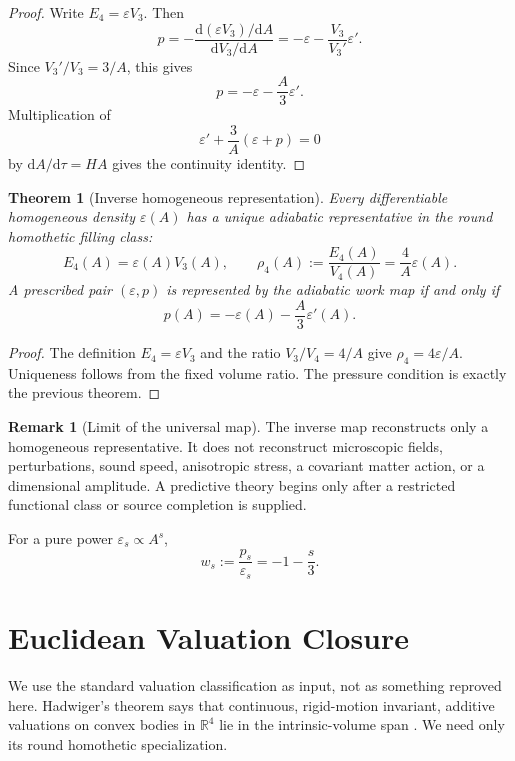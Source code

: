 \documentclass[aps,prd,preprint,onecolumn,nofootinbib,superscriptaddress,showkeys]{revtex4-2}
\numberwithin{equation}{section}
\theoremstyle{definition}
\newtheorem{remark}{Remark}[section]
\theoremstyle{plain}
\newtheorem{theorem}{Theorem}[section]
\newcommand{\R}{\mathbb R}
\newcommand{\dd}{\mathrm d}
\begin{document}
\begin{proof}
Write \(E_4=\varepsilon V_3\).  Then
\[
p=-\frac{\dd(\varepsilon V_3)/\dd A}{\dd V_3/\dd A}
=-\varepsilon-\frac{V_3}{V_3'}\varepsilon'.
\]
Since \(V_3'/V_3=3/A\), this gives
\[
p=-\varepsilon-\frac A3\varepsilon'.
\]
Multiplication of
\[
\varepsilon'+\frac3A(\varepsilon+p)=0
\]
by \(\dd A/\dd\tau=HA\) gives the continuity identity.
\end{proof}

\begin{theorem}[Inverse homogeneous representation]
Every differentiable homogeneous density \(\varepsilon(A)\) has a unique adiabatic representative in the round homothetic filling class:
\begin{equation}
E_4(A)=\varepsilon(A)V_3(A),
\qquad
\rho_4(A):=\frac{E_4(A)}{V_4(A)}
=\frac4A\varepsilon(A).
\end{equation}
A prescribed pair \((\varepsilon,p)\) is represented by the adiabatic work map if and only if
\begin{equation}
p(A)=-\varepsilon(A)-\frac A3\varepsilon'(A).
\end{equation}
\end{theorem}

\begin{proof}
The definition \(E_4=\varepsilon V_3\) and the ratio \(V_3/V_4=4/A\) give \(\rho_4=4\varepsilon/A\).  Uniqueness follows from the fixed volume ratio.  The pressure condition is exactly the previous theorem.
\end{proof}

\begin{remark}[Limit of the universal map]
The inverse map reconstructs only a homogeneous representative.  It does not reconstruct microscopic fields, perturbations, sound speed, anisotropic stress, a covariant matter action, or a dimensional amplitude.  A predictive theory begins only after a restricted functional class or source completion is supplied.
\end{remark}

For a pure power \(\varepsilon_s\propto A^s\),
\begin{equation}
w_s:=\frac{p_s}{\varepsilon_s}
=-1-\frac s3.
\end{equation}

\section{Euclidean Valuation Closure}

We use the standard valuation classification as input, not as something reproved here.  Hadwiger's theorem says that continuous, rigid-motion invariant, additive valuations on convex bodies in \(\R^4\) lie in the intrinsic-volume span \cite{Hadwiger1957,Schneider2014}.  We need only its round homothetic specialization.
\end{document}
